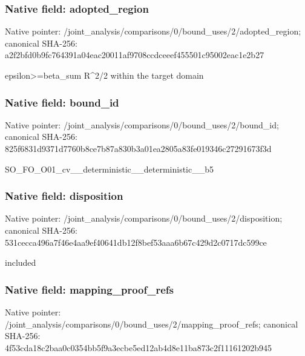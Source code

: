 \documentclass[10pt,a4paper]{article}
\begin{document}
\subsubsection{Native field: adopted\_\allowbreak{}region}
Native pointer: /joint\_\allowbreak{}analysis/comparisons/0/bound\_\allowbreak{}uses/2/adopted\_\allowbreak{}region; canonical SHA-256: a2f2bfd0b9fc764391a04eac20011af9708ccdceeef455501c95002eac1e2b27

\begingroup\raggedright\sloppy epsilon>=\allowbreak{}beta\_\allowbreak{}sum R\textasciicircum{}2/\allowbreak{}2 within the target domain\par\endgroup

\subsubsection{Native field: bound\_\allowbreak{}id}
Native pointer: /joint\_\allowbreak{}analysis/comparisons/0/bound\_\allowbreak{}uses/2/bound\_\allowbreak{}id; canonical SHA-256: 825f6831d9371d7760b8ce7b87a830b3a01ea2805a83fe019346c27291673f3d

\begingroup\raggedright\sloppy SO\_\allowbreak{}FO\_\allowbreak{}O01\_\allowbreak{}cv\_\allowbreak{}\_\allowbreak{}deterministic\_\allowbreak{}\_\allowbreak{}deterministic\_\allowbreak{}\_\allowbreak{}b5\par\endgroup

\subsubsection{Native field: disposition}
Native pointer: /joint\_\allowbreak{}analysis/comparisons/0/bound\_\allowbreak{}uses/2/disposition; canonical SHA-256: 531cecca496a7f46e4aa9ef40641db12f8bef53aaa6b67c429d2c0717dc599ce

\begingroup\raggedright\sloppy included\par\endgroup

\subsubsection{Native field: mapping\_\allowbreak{}proof\_\allowbreak{}refs}
Native pointer: /joint\_\allowbreak{}analysis/comparisons/0/bound\_\allowbreak{}uses/2/mapping\_\allowbreak{}proof\_\allowbreak{}refs; canonical SHA-256: 4f53cda18c2baa0c0354bb5f9a3ecbe5ed12ab4d8e11ba873c2f11161202b945
\end{document}
